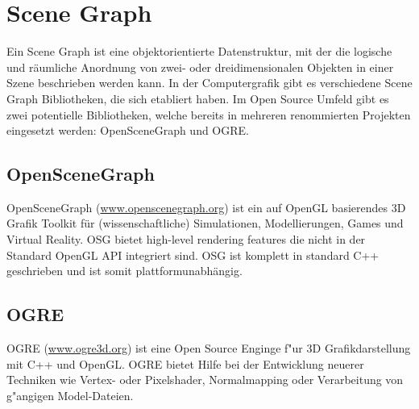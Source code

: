 \section{Scene Graph}
Ein Scene Graph ist eine objektorientierte Datenstruktur, mit der die logische und r\"aumliche Anordnung von zwei- oder dreidimensionalen Objekten in einer Szene beschrieben werden kann.
In der Computergrafik gibt es verschiedene Scene Graph Bibliotheken, die sich etabliert haben. Im Open Source Umfeld gibt es zwei potentielle Bibliotheken, welche bereits in mehreren renommierten Projekten eingesetzt werden: OpenSceneGraph und OGRE.


\subsection{OpenSceneGraph}
OpenSceneGraph (\href{http://www.openscenegraph.com}{www.openscenegraph.org}) ist ein auf OpenGL basierendes 3D Grafik Toolkit f\"ur (wissenschaftliche) Simulationen, Modellierungen, Games und Virtual Reality. OSG bietet high-level rendering features die nicht in der Standard OpenGL API integriert sind.
OSG ist komplett in standard C++ geschrieben und ist somit plattformunabh\"angig.

\subsection{OGRE}
OGRE (\href{http://www.ogre3d.org}{www.ogre3d.org}) ist eine Open Source Enginge f"ur 3D Grafikdarstellung mit C++ und OpenGL. OGRE bietet Hilfe bei der Entwicklung neuerer Techniken wie Vertex- oder Pixelshader, Normalmapping oder Verarbeitung von g"angigen Model-Dateien. 


